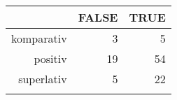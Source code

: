 \begin{tabular}{rrr}
  \lsptoprule
 & FALSE & TRUE \\ 
  \midrule
komparativ & 3 & 5 \\ 
  positiv & 19 & 54 \\ 
  superlativ & 5 & 22 \\ 
   \lspbottomrule
\end{tabular}

